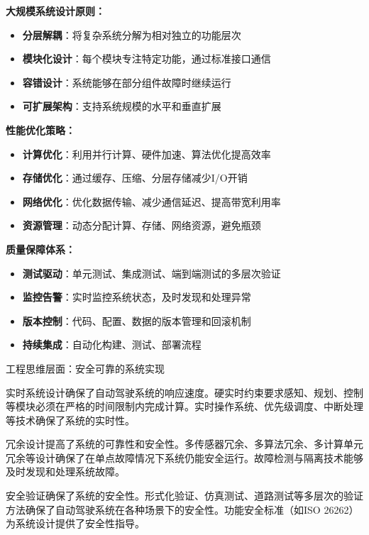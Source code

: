 \begin{tcolorbox}[colback=green!5!white,colframe=green!75!black,title=方法要点：工程实现的系统性方法]
\textbf{大规模系统设计原则：}
\begin{itemize}
\item \textbf{分层解耦}：将复杂系统分解为相对独立的功能层次
\item \textbf{模块化设计}：每个模块专注特定功能，通过标准接口通信
\item \textbf{容错设计}：系统能够在部分组件故障时继续运行
\item \textbf{可扩展架构}：支持系统规模的水平和垂直扩展
\end{itemize}

\textbf{性能优化策略：}
\begin{itemize}
\item \textbf{计算优化}：利用并行计算、硬件加速、算法优化提高效率
\item \textbf{存储优化}：通过缓存、压缩、分层存储减少I/O开销
\item \textbf{网络优化}：优化数据传输、减少通信延迟、提高带宽利用率
\item \textbf{资源管理}：动态分配计算、存储、网络资源，避免瓶颈
\end{itemize}

\textbf{质量保障体系：}
\begin{itemize}
\item \textbf{测试驱动}：单元测试、集成测试、端到端测试的多层次验证
\item \textbf{监控告警}：实时监控系统状态，及时发现和处理异常
\item \textbf{版本控制}：代码、配置、数据的版本管理和回滚机制
\item \textbf{持续集成}：自动化构建、测试、部署流程
\end{itemize}
\end{tcolorbox}

工程思维层面：安全可靠的系统实现

实时系统设计确保了自动驾驶系统的响应速度。硬实时约束要求感知、规划、控制等模块必须在严格的时间限制内完成计算。实时操作系统、优先级调度、中断处理等技术确保了系统的实时性。

冗余设计提高了系统的可靠性和安全性。多传感器冗余、多算法冗余、多计算单元冗余等设计确保了在单点故障情况下系统仍能安全运行。故障检测与隔离技术能够及时发现和处理系统故障。

安全验证确保了系统的安全性。形式化验证、仿真测试、道路测试等多层次的验证方法确保了自动驾驶系统在各种场景下的安全性。功能安全标准（如ISO 26262）为系统设计提供了安全性指导。


